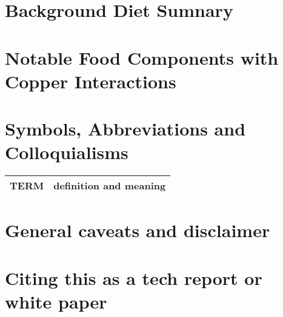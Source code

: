 \begin{mdpicomment}
\section{Background Diet Sumnary}




\section{Notable Food Components with Copper Interactions}

\label{appendix:interactions}
\mjmhuntcu

\section{Symbols, Abbreviations and Colloquialisms}

\begin{comment}
\end{comment}


\noindent
\begin{tabular}{@{}ll}
TERM & definition and meaning   \\
\hline
\end{tabular} %


\section{General caveats and disclaimer }
\label{appendix:caveats}

%



\section{Citing this as a tech report or white paper }
\label{appendix:citing}


\end{mdpicomment}
